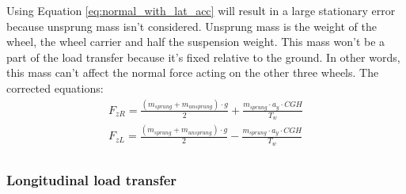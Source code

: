Using Equation \ref{eq:normal_with_lat_acc} will result in a large stationary error because unsprung mass isn't considered. Unsprung mass is the weight of the wheel, the wheel carrier and half the suspension weight. This mass won't be a part of the load transfer because it's fixed relative to the ground. In other words, this mass can't affect the normal force acting on the other three wheels. The corrected equations:
\begin{equation} \label{eq:normal_with_lat_acc_unsprung}
\begin{split}
F_{zR} = \frac{(m_{sprung}+m_{unsprung})\cdot g}{2} + \frac{m_{sprung}\cdot a_{y}\cdot CGH}{T_{w}} \\
F_{zL} = \frac{(m_{sprung}+m_{unsprung})\cdot g}{2} - \frac{m_{sprung}\cdot a_{y}\cdot CGH}{T_{w}} \\
\end{split}
\end{equation}

\subsubsection{Longitudinal load transfer}

